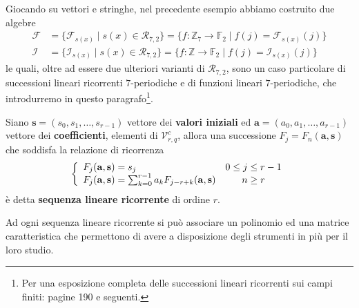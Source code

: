 Giocando su vettori e stringhe, nel precedente esempio abbiamo costruito due algebre
   \begin{align*}
      \mathscr{F} &= \lbrace  \mathscr{F}_{s(x)} \mid s(x) \in \mathcal{R}_{7,2} \rbrace
                = \lbrace f:\mathbb{Z}_{7}\rightarrow\mathbb{F}_{2} \mid f(j)=\mathscr{F}_{s(x)}(j) \rbrace
      \\
      \mathscr{I} &= \lbrace  \mathscr{I}_{s(x)} \mid s(x) \in \mathcal{R}_{7,2} \rbrace
           =\lbrace f:\mathbb{Z} \rightarrow  \mathbb{F}_{2} \mid f(j) = \mathscr{I}_{s(x)}(j) \rbrace
   \end{align*}
le quali, oltre ad essere due ulteriori varianti di $\mathcal{R}_{7,2}$, sono un caso particolare di successioni lineari ricorrenti $7$-periodiche e di funzioni lineari $7$-periodiche, che introdurremo in questo paragrafo\footnote{Per una esposizione completa delle successioni lineari ricorrenti sui campi finiti: \cite{lidl} pagine 190 e seguenti.}.
\begin{definizione}
   Siano $\mathbf{s} = (s_0, s_1, \dots , s_{r-1})$ vettore dei {\bf valori iniziali} ed $\mathbf{a} = (a_0, a_1, \dots , a_{r-1})$ vettore dei {\bf coefficienti}, elementi di $\mathcal{V}_{r, q}^{c}$, allora una successione $F_{j} = F_{n}(\mathbf{a},\mathbf{s})$ che soddisfa la relazione di ricorrenza
   \begin{displaymath}
     \left\{
     \begin{array}{l c}
     F_{j}(\mathbf{a},\mathbf{s}) = s_{j} & 0 \leq j \leq r-1 \\
      F_{j}(\mathbf{a},\mathbf{s}) = \sum_{k=0}^{r-1} a_{k} F_{j-r+k}(\mathbf{a},\mathbf{s})  & n \geq r
     \end{array}
     \right.
     \end{displaymath}
   è detta {\bf sequenza lineare ricorrente} di ordine $r$.
\end{definizione}
Ad ogni sequenza lineare ricorrente si può associare un polinomio ed una matrice caratteristica che permettono di avere a disposizione degli strumenti in più per il loro studio.
